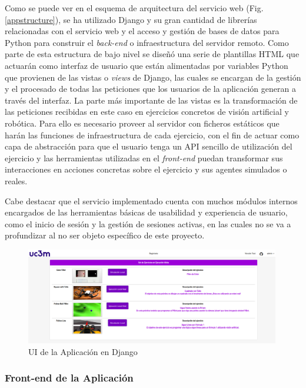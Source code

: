 Como se puede ver en el esquema de arquitectura del servicio web (Fig. \ref{appstructure}), se ha utilizado Django y su gran cantidad de librerías relacionadas con el servicio web y el acceso y gestión de bases de datos para Python para construir el \textit{back-end} o infraestructura del servidor remoto. Como parte de esta estructura de bajo nivel se diseñó una serie de plantillas HTML que actuarán como interfaz de usuario que están alimentadas por variables Python que provienen de las vistas o \textit{views} de Django, las cuales se encargan de la gestión y el procesado de todas las peticiones que los usuarios de la aplicación generan a través del interfaz. La parte más importante de las vistas es la transformación de las peticiones recibidas en este caso en ejercicios concretos de visión artificial y robótica. Para ello es necesario proveer al servidor con ficheros estáticos que harán las funciones de infraestructura de cada ejercicio, con el fin de actuar como capa de abstracción para que el usuario tenga un API sencillo de utilización del ejercicio y las herramientas utilizadas en el \textit{front-end} puedan transformar sus interacciones en acciones concretas sobre el ejercicio y sus agentes simulados o reales.

Cabe destacar que el servicio implementado cuenta con muchos módulos internos encargados de las herramientas básicas de usabilidad y experiencia de usuario, como el inicio de sesión y la gestión de sesiones activas, en las cuales no se va a profundizar al no ser objeto específico de este proyecto.

\begin{figure}[!hbtp]  \centering\noindent
    \includegraphics[width=0.99\textwidth]{figures/app_ui.png}
    \caption{UI de la Aplicación en Django}
    \label{appui}
\end{figure}

\subsubsection{Front-end de la Aplicación}

